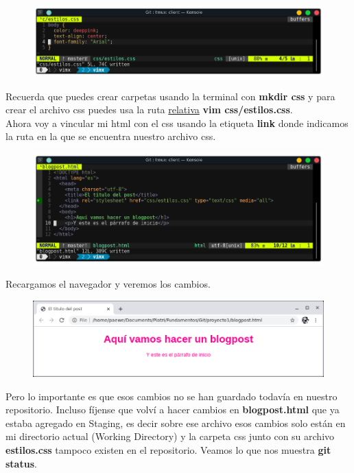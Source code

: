 \documentclass{article}
\begin{document}
\begin{figure}[h!]
  \centering
  \includegraphics[scale=0.75]{./Pictures/108_estilos.png}
\end{figure}

Recuerda que puedes crear carpetas usando la terminal con \textbf{mkdir css} y
para crear el archivo css puedes usa la ruta
\href{https://www.linuxnix.com/abslute-path-vs-relative-path-in-linuxunix/}{relativa}
\textbf{vim css/estilos.css}.\\

Ahora voy a vincular mi html con el css usando la etiqueta \textbf{link} donde
indicamos la ruta en la que se encuentra nuestro archivo css.

\begin{figure}[h!]
  \centering
  \includegraphics[scale=0.75]{./Pictures/109_estilos_blogpost.png}
\end{figure}

Recargamos el navegador y veremos los cambios.

\begin{figure}[h!]
  \centering
  \includegraphics[scale=0.75]{./Pictures/110_blopost_web.png}
\end{figure}

Pero lo importante es que esos cambios no se han guardado todavía en nuestro
repositorio. Incluso fíjense que volví a hacer cambios en
\textbf{blogpost.html} que ya estaba agregado en Staging, es decir sobre ese
archivo esos cambios solo están en mi directorio actual (Working Directory) y
la carpeta css junto con su archivo \textbf{estilos.css} tampoco existen en el
repositorio. Veamos lo que nos muestra \textbf{git status}.
\end{document}
